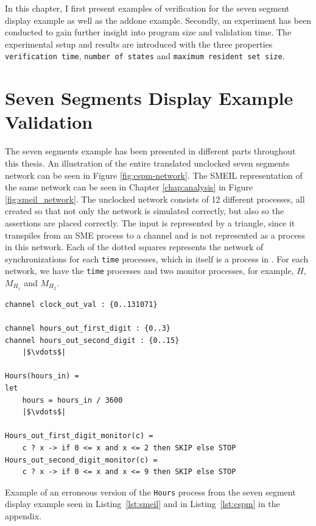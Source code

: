
In this chapter, I first present examples of verification for the seven segment display example as well as the addone example. Secondly, an experiment has been conducted to gain further insight into program size and validation time. The experimental setup and results are introduced with the three properties \texttt{verification time}, \texttt{number of states} and \texttt{maximum resident set size}.

\section{Seven Segments Display Example Validation}
The seven segments example has been presented in different parts throughout this thesis. An illustration of the entire translated unclocked seven segments network can be seen in Figure \ref{fig:cspm-network}. The SMEIL representation of the same network can be seen in Chapter \ref{chap:analysis} in Figure \ref{fig:smeil_network}.
The unclocked \cspm{} network consists of 12 different processes, all created so that not only the network is simulated correctly, but also so the assertions are placed correctly. The input is represented by a triangle, since it transpiles from an SME process to a \cspm{} channel and is not represented as a process in this network. Each of the dotted squares represents the network of synchronizations for each \texttt{time} processes, which in itself is a process in \cspm{}. For each network, we have the \texttt{time} processes and two monitor processes, for example, $H$, $M_{H_1}$ and $M_{H_2}$.
\\

\begin{listing}
\begin{verbatim}
channel clock_out_val : {0..131071}

channel hours_out_first_digit : {0..3}
channel hours_out_second_digit : {0..15}
    |$\vdots$|

Hours(hours_in) =
let
    hours = hours_in / 3600
    |$\vdots$|

Hours_out_first_digit_monitor(c) =
    c ? x -> if 0 <= x and x <= 2 then SKIP else STOP
Hours_out_second_digit_monitor(c) =
    c ? x -> if 0 <= x and x <= 9 then SKIP else STOP

\end{verbatim}
\caption{Example of an erroneous version of the \texttt{Hours} process from the \cspm{} seven segment display example seen in Listing~\ref{lst:smeil} and in Listing~\ref{lst:cspm} in the appendix.}
\label{lst:cspm_error}
\end{listing}


